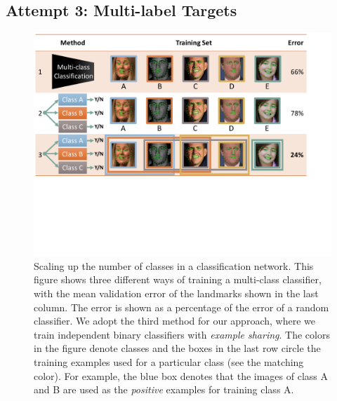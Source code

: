 \documentclass[letterpaper]{article} %
\begin{document}
\subsection{Attempt 3: Multi-label Targets}

\begin{figure}[t]
\begin{center}
   \includegraphics[width=1\linewidth]{fig/Classification4.pdf}
\end{center}
   \caption{Scaling up the number of classes in a classification network. This figure shows three different ways of training a multi-class classifier, with the mean validation error of the landmarks shown in the last column. The error is shown as a percentage of the error of a random classifier. We adopt the third method for our approach, where we train independent binary classifiers with {\em example sharing}. The colors in the figure denote classes and the boxes in the last row circle the training examples used for a particular class (see the matching color). For example, the blue box denotes that the images of class A and B are used as the {\em positive} examples for training class A.}
\label{fig:classify}
\end{figure}
\end{document}
